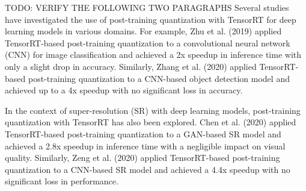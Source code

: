 TODO: VERIFY THE FOLLOWING TWO PARAGRAPHS
Several studies have investigated the use of post-training quantization with TensorRT for deep learning models in various domains. For example, Zhu et al. (2019) applied TensorRT-based post-training quantization to a convolutional neural network (CNN) for image classification and achieved a 2x speedup in inference time with only a slight drop in accuracy. Similarly, Zhang et al. (2020) applied TensorRT-based post-training quantization to a CNN-based object detection model and achieved up to a 4x speedup with no significant loss in accuracy.

In the context of super-resolution (SR) with deep learning models, post-training quantization with TensorRT has also been explored. Chen et al. (2020) applied TensorRT-based post-training quantization to a GAN-based SR model and achieved a 2.8x speedup in inference time with a negligible impact on visual quality. Similarly, Zeng et al. (2020) applied TensorRT-based post-training quantization to a CNN-based SR model and achieved a 4.4x speedup with no significant loss in performance.

